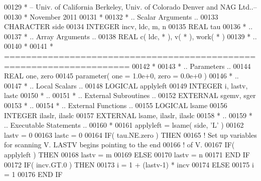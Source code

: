 \begin{DoxyCode}
00129 \textcolor{comment}{*  -- Univ. of California Berkeley, Univ. of Colorado Denver and NAG Ltd..--}
00130 \textcolor{comment}{*     November 2011}
00131 \textcolor{comment}{*}
00132 \textcolor{comment}{*     .. Scalar Arguments ..}
00133       \textcolor{keywordtype}{CHARACTER}          side
00134       \textcolor{keywordtype}{INTEGER}            incv, ldc, m, n
00135       \textcolor{keywordtype}{REAL}               tau
00136 \textcolor{comment}{*     ..}
00137 \textcolor{comment}{*     .. Array Arguments ..}
00138       \textcolor{keywordtype}{REAL}               c( ldc, * ), v( * ), work( * )
00139 \textcolor{comment}{*     ..}
00140 \textcolor{comment}{*}
00141 \textcolor{comment}{*  =====================================================================}
00142 \textcolor{comment}{*}
00143 \textcolor{comment}{*     .. Parameters ..}
00144       \textcolor{keywordtype}{REAL}               one, zero
00145       parameter( one = 1.0e+0, zero = 0.0e+0 )
00146 \textcolor{comment}{*     ..}
00147 \textcolor{comment}{*     .. Local Scalars ..}
00148       \textcolor{keywordtype}{LOGICAL}            applyleft
00149       \textcolor{keywordtype}{INTEGER}            i, lastv, lastc
00150 \textcolor{comment}{*     ..}
00151 \textcolor{comment}{*     .. External Subroutines ..}
00152       \textcolor{keywordtype}{EXTERNAL}           sgemv, sger
00153 \textcolor{comment}{*     ..}
00154 \textcolor{comment}{*     .. External Functions ..}
00155       \textcolor{keywordtype}{LOGICAL}            lsame
00156       \textcolor{keywordtype}{INTEGER}            ilaslr, ilaslc
00157       \textcolor{keywordtype}{EXTERNAL}           lsame, ilaslr, ilaslc
00158 \textcolor{comment}{*     ..}
00159 \textcolor{comment}{*     .. Executable Statements ..}
00160 \textcolor{comment}{*}
00161       applyleft = lsame( side, \textcolor{stringliteral}{'L'} )
00162       lastv = 0
00163       lastc = 0
00164       \textcolor{keywordflow}{IF}( tau.NE.zero ) \textcolor{keywordflow}{THEN}
00165 \textcolor{comment}{!     Set up variables for scanning V.  LASTV begins pointing to the end}
00166 \textcolor{comment}{!     of V.}
00167          \textcolor{keywordflow}{IF}( applyleft ) \textcolor{keywordflow}{THEN}
00168             lastv = m
00169          \textcolor{keywordflow}{ELSE}
00170             lastv = n
00171 \textcolor{keywordflow}{         END IF}
00172          \textcolor{keywordflow}{IF}( incv.GT.0 ) \textcolor{keywordflow}{THEN}
00173             i = 1 + (lastv-1) * incv
00174          \textcolor{keywordflow}{ELSE}
00175             i = 1
00176 \textcolor{keywordflow}{         END IF}

\end{DoxyCode}
